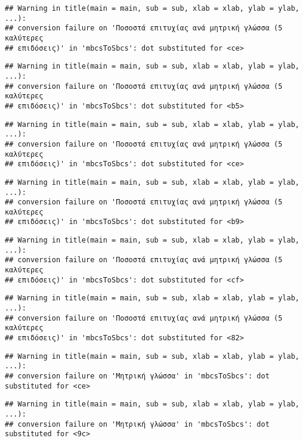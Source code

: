 \documentclass[
]{article}
\begin{document}
\begin{verbatim}
## Warning in title(main = main, sub = sub, xlab = xlab, ylab = ylab, ...):
## conversion failure on 'Ποσοστά επιτυχίας ανά μητρική γλώσσα (5 καλύτερες
## επιδόσεις)' in 'mbcsToSbcs': dot substituted for <ce>
\end{verbatim}

\begin{verbatim}
## Warning in title(main = main, sub = sub, xlab = xlab, ylab = ylab, ...):
## conversion failure on 'Ποσοστά επιτυχίας ανά μητρική γλώσσα (5 καλύτερες
## επιδόσεις)' in 'mbcsToSbcs': dot substituted for <b5>
\end{verbatim}

\begin{verbatim}
## Warning in title(main = main, sub = sub, xlab = xlab, ylab = ylab, ...):
## conversion failure on 'Ποσοστά επιτυχίας ανά μητρική γλώσσα (5 καλύτερες
## επιδόσεις)' in 'mbcsToSbcs': dot substituted for <ce>
\end{verbatim}

\begin{verbatim}
## Warning in title(main = main, sub = sub, xlab = xlab, ylab = ylab, ...):
## conversion failure on 'Ποσοστά επιτυχίας ανά μητρική γλώσσα (5 καλύτερες
## επιδόσεις)' in 'mbcsToSbcs': dot substituted for <b9>
\end{verbatim}

\begin{verbatim}
## Warning in title(main = main, sub = sub, xlab = xlab, ylab = ylab, ...):
## conversion failure on 'Ποσοστά επιτυχίας ανά μητρική γλώσσα (5 καλύτερες
## επιδόσεις)' in 'mbcsToSbcs': dot substituted for <cf>
\end{verbatim}

\begin{verbatim}
## Warning in title(main = main, sub = sub, xlab = xlab, ylab = ylab, ...):
## conversion failure on 'Ποσοστά επιτυχίας ανά μητρική γλώσσα (5 καλύτερες
## επιδόσεις)' in 'mbcsToSbcs': dot substituted for <82>
\end{verbatim}

\begin{verbatim}
## Warning in title(main = main, sub = sub, xlab = xlab, ylab = ylab, ...):
## conversion failure on 'Μητρική γλώσσα' in 'mbcsToSbcs': dot substituted for <ce>
\end{verbatim}

\begin{verbatim}
## Warning in title(main = main, sub = sub, xlab = xlab, ylab = ylab, ...):
## conversion failure on 'Μητρική γλώσσα' in 'mbcsToSbcs': dot substituted for <9c>
\end{verbatim}
\end{document}
